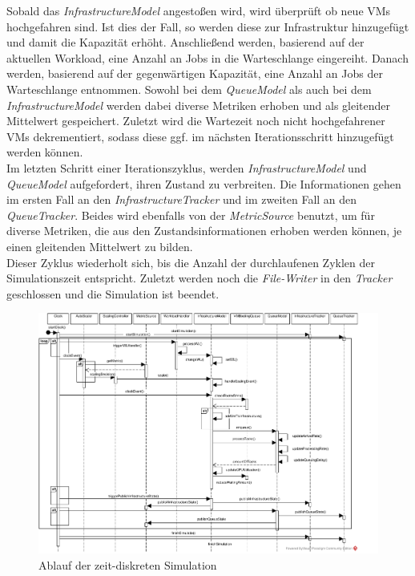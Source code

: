 Sobald das \textit{InfrastructureModel} angestoßen wird, wird überprüft ob neue VMs hochgefahren sind. Ist dies der Fall, so werden diese zur Infrastruktur hinzugefügt und damit die Kapazität erhöht. Anschließend werden, basierend auf der aktuellen Workload, eine Anzahl an Jobs in die Warteschlange eingereiht. Danach werden, basierend auf der gegenwärtigen Kapazität, eine Anzahl an Jobs der Warteschlange entnommen. Sowohl bei dem \textit{QueueModel} als auch bei dem \textit{InfrastructureModel} werden dabei diverse Metriken erhoben und als gleitender Mittelwert gespeichert. Zuletzt wird die Wartezeit noch nicht hochgefahrener VMs dekrementiert, sodass diese ggf. im nächsten Iterationsschritt hinzugefügt werden können. \\
Im letzten Schritt einer Iterationszyklus, werden \textit{InfrastructureModel} und \textit{QueueModel} aufgefordert, ihren Zustand zu verbreiten. Die Informationen gehen im ersten Fall an den \textit{InfrastructureTracker} und im zweiten Fall an den \textit{QueueTracker}. Beides wird ebenfalls von der \textit{MetricSource} benutzt, um für diverse Metriken, die aus den Zustandsinformationen erhoben werden können, je einen gleitenden Mittelwert zu bilden. \\
Dieser Zyklus wiederholt sich, bis die Anzahl der durchlaufenen Zyklen der Simulationszeit entspricht. Zuletzt werden noch die \textit{File-Writer} in den \textit{Tracker} geschlossen und die Simulation ist beendet.  

 

\begin{figure}[!h]
	\centering
	\begin{sideways}
	\includegraphics[width=22cm, trim={0cm 0cm 2cm 1cm}]{img/ablauf.pdf}
	\end{sideways}
	\caption{Ablauf der zeit-diskreten Simulation}
	\label{fig:ablauf}
\end{figure}



